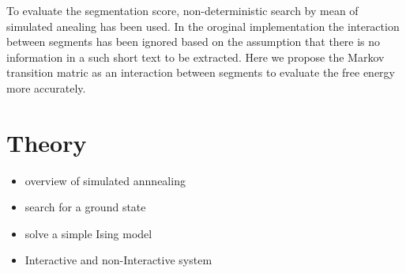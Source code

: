 \documentclass[11pt]{article}
\begin{document}
To evaluate the segmentation score, non-deterministic search by mean of
simulated anealing has been used. In the oroginal implementation the interaction
between segments has been ignored based on the assumption that there is no information in a such short text to be extracted.
Here we propose the Markov transition matric as an interaction between segments to evaluate the free energy more accurately.

\section{Theory}
\begin{itemize}
\item overview of simulated annnealing
\item search for a ground state
\item solve a simple Ising model
\item Interactive and non-Interactive system
\end{itemize}
\end{document}
